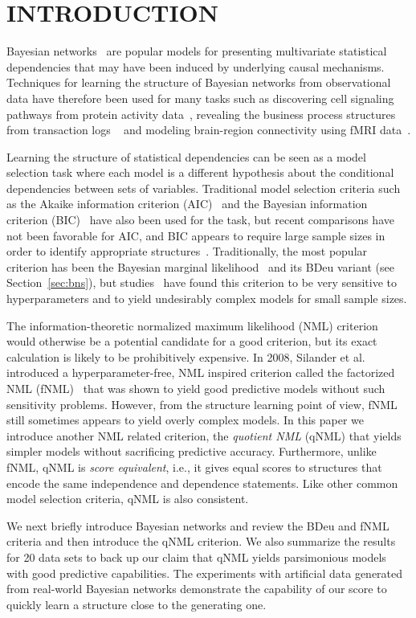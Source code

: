 \section{INTRODUCTION}
\label{sec:intro}
Bayesian networks~\cite{Pear88} are popular models for presenting
multivariate statistical dependencies that may have been induced by
underlying causal mechanisms.  Techniques for learning the structure
of Bayesian networks from observational data have therefore been used
for many tasks such as discovering cell signaling pathways from
protein activity data~\cite{bn4sigpath02}, revealing the business
process structures from transaction logs ~\cite{bn4bpmining} and
modeling brain-region connectivity using fMRI
data~\cite{bn4brainconnect}.

Learning the structure of statistical dependencies can be seen as a
model selection task where each model is a different hypothesis about
the conditional dependencies between sets of variables. Traditional
model selection criteria such as the Akaike information criterion
(AIC)~\cite{Akai73} and the Bayesian information criterion
(BIC)~\cite{Schw78} have also been used for the task, but recent
comparisons have not been favorable for AIC, and BIC appears to
require large sample sizes in order to identify appropriate
structures~\cite{cosco.pgm08a,Liu2012}. Traditionally, the most
popular criterion has been the Bayesian marginal
likelihood~\cite{Heck95b} and its BDeu variant (see
Section~\ref{sec:bns}), but studies~\cite{cosco.uai07,Steck08} have
found this criterion to be very sensitive to hyperparameters and to
yield undesirably complex models for small sample sizes.

The information-theoretic normalized maximum likelihood (NML)
criterion~\cite{Shta87,Riss96a} would otherwise be a potential
candidate for a good criterion, but its exact calculation is likely to
be prohibitively expensive. In 2008, Silander et al. introduced a
hyperparameter-free, NML inspired criterion called the factorized NML
(fNML)~\cite{cosco.pgm08a} that was shown to yield good predictive
models without such sensitivity problems. However, from the structure
learning point of view, fNML still sometimes appears to yield
overly complex models. In this paper we introduce another NML related
criterion, the \textit{quotient NML} (qNML) that yields simpler models
without sacrificing predictive accuracy. Furthermore, unlike fNML,
qNML is \textit{score equivalent}, i.e., it gives equal scores to
structures that encode the same independence and dependence
statements. Like other common model selection criteria, qNML is also
consistent.

We next briefly introduce Bayesian networks and review the BDeu and
fNML criteria and then introduce the qNML criterion.  We also
summarize the results for 20 data sets to back up our claim that qNML
yields parsimonious models with good predictive capabilities. The
experiments with artificial data generated from real-world Bayesian networks demonstrate the capability of our score to quickly learn a structure close to the generating one.

